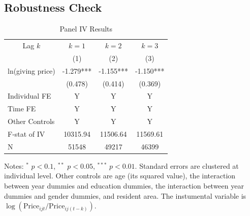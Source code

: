 \documentclass[ review  , 3p ]{elsarticle}
\begin{document}
  \hypertarget{robustness-check}{%
  \subsection{Robustness Check}\label{robustness-check}}
  
  \begin{table}
  
  \caption{\label{tab:kablePanelIVEstimateElasticity}Panel IV Results}
  \centering
  \begin{threeparttable}
  \begin{tabular}[t]{lccc}
  \toprule
  \multicolumn{1}{c}{Lag $k$} & \multicolumn{1}{c}{$k = 1$} & \multicolumn{1}{c}{$k = 2$} & \multicolumn{1}{c}{$k = 3$} \\
  \cmidrule(l{3pt}r{3pt}){1-1} \cmidrule(l{3pt}r{3pt}){2-2} \cmidrule(l{3pt}r{3pt}){3-3} \cmidrule(l{3pt}r{3pt}){4-4}
   & (1) & (2) & (3)\\
  \midrule
  ln(giving price) & -1.279*** & -1.155*** & -1.150***\\
   & (0.478) & (0.414) & (0.369)\\
  Individual FE & Y & Y & Y\\
  Time FE & Y & Y & Y\\
  Other Controls & Y & Y & Y\\
  F-stat of IV & 10315.94 & 11506.64 & 11569.61\\
  N & 51548 & 49217 & 46399\\
  \bottomrule
  \end{tabular}
  \begin{tablenotes}
  \item Notes: $^{*}$ $p < 0.1$, $^{**}$ $p < 0.05$, $^{***}$ $p < 0.01$. Standard errors are clustered at individual level. Other controls are age (its squared value), the interaction between year dummies and education dummies, the interaction between year dummies and gender dummies, and resident area. The instumental variable is $\log(\text{Price}_{ijt}/\text{Price}_{ij(t-k)})$.
  \end{tablenotes}
  \end{threeparttable}
  \end{table}
  
\end{document}
